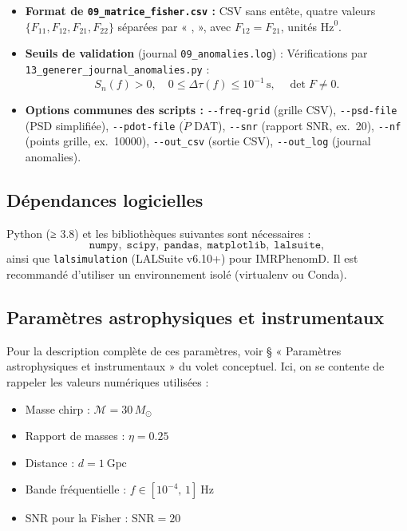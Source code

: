 \begin{itemize}
  \item \textbf{Format de \texttt{09\_matrice\_fisher.csv} :}
    CSV sans entête, quatre valeurs \(\{F_{11},F_{12},F_{21},F_{22}\}\) séparées par « , »,
    avec \(F_{12}=F_{21}\), unités \(\mathrm{Hz}^0\).

  \item \textbf{Seuils de validation} (journal \texttt{09\_anomalies.log}) :
    Vérifications par \texttt{13\_generer\_journal\_anomalies.py} :
    \[
      S_{n}(f)>0,\quad
      0\le\Delta\tau(f)\le10^{-1}\,\mathrm{s},\quad
      \det F\neq0.
    \]

  \item \textbf{Options communes des scripts :}
    \verb|--freq-grid| (grille CSV),
    \verb|--psd-file| (PSD simplifiée),
    \verb|--pdot-file| (\(\dot P\) DAT),
    \verb|--snr| (rapport SNR, ex.~20),
    \verb|--nf| (points grille, ex.~10000),
    \verb|--out_csv| (sortie CSV),
    \verb|--out_log| (journal anomalies).
\end{itemize}

\subsection{Dépendances logicielles}
Python (≥ 3.8) et les bibliothèques suivantes sont nécessaires :
\[
  \texttt{numpy},\;\texttt{scipy},\;\texttt{pandas},\;\texttt{matplotlib},\;\texttt{lalsuite},
\]
ainsi que \texttt{lalsimulation} (LALSuite v6.10+) pour IMRPhenomD.
Il est recommandé d’utiliser un environnement isolé (virtualenv ou Conda).

\subsection{Paramètres astrophysiques et instrumentaux}
Pour la description complète de ces paramètres, voir § « Paramètres astrophysiques et instrumentaux » du volet conceptuel.
Ici, on se contente de rappeler les valeurs numériques utilisées :

\begin{itemize}
  \item Masse chirp : \(\mathcal{M}=30\,M_{\odot}\)
  \item Rapport de masses : \(\eta=0.25\)
  \item Distance : \(d=1\ \mathrm{Gpc}\)
  \item Bande fréquentielle : \(f\in[10^{-4},\,1]\ \mathrm{Hz}\)
  \item SNR pour la Fisher : \(\mathrm{SNR}=20\)
\end{itemize}


